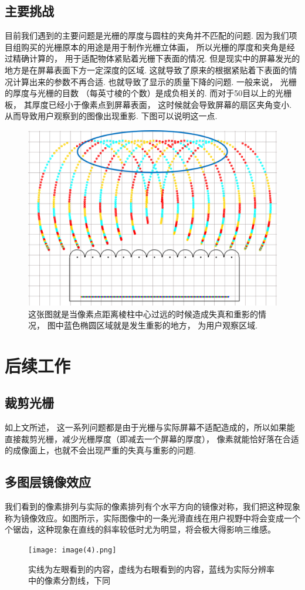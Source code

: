\documentclass[12pt,a4paper]{article}
\begin{document}
\FloatBarrier


\subsection{主要挑战}

目前我们遇到的主要问题是光栅的厚度与圆柱的夹角并不匹配的问题. 因为我们项目组购买的光栅原本的用途是用于制作光栅立体画， 所以光栅的厚度和夹角是经过精确计算的， 用于适配物体紧贴着光栅下表面的情况. 但是现实中的屏幕发光的地方是在屏幕表面下方一定深度的区域. 这就导致了原来的根据紧贴着下表面的情况计算出来的参数不再合适. 也就导致了显示的质量下降的问题. 一般来说， 光栅的厚度与光栅的目数 （每英寸棱的个数）是成负相关的. 而对于50目以上的光栅板， 其厚度已经小于像素点到屏幕表面， 这时候就会导致屏幕的扇区夹角变小. 从而导致用户观察到的图像出现重影. 下图可以说明这一点.
\begin{figure}[h!]
    \centering\includegraphics[width=0.8\linewidth]{wrong.png}
    \caption{这张图就是当像素点距离棱柱中心过远的时候造成失真和重影的情况， 图中蓝色椭圆区域就是发生重影的地方， 为用户观察区域.}
\end{figure}

\section{后续工作}


\subsection{裁剪光栅}
如上文所述， 这一系列问题都是由于光栅与实际屏幕不适配造成的，所以如果能直接裁剪光栅，减少光栅厚度（即减去一个屏幕的厚度）， 像素就能恰好落在合适的成像面上，也就不会出现严重的失真与重影的问题.

\subsection{多图层镜像效应}
我们看到的像素排列与实际的像素排列有个水平方向的镜像对称，我们把这种现象称为镜像效应。如图所示，实际图像中的一条光滑直线在用户视野中将会变成一个个锯齿，这种现象在直线的斜率较低时尤为明显，将会极大得影响三维感。
\begin{figure}[h!]
    \centering\texttt{[image: image(4).png]}
    \caption{实线为左眼看到的内容，虚线为右眼看到的内容，蓝线为实际分辨率中的像素分割线，下同}
\end{figure}
\end{document}
